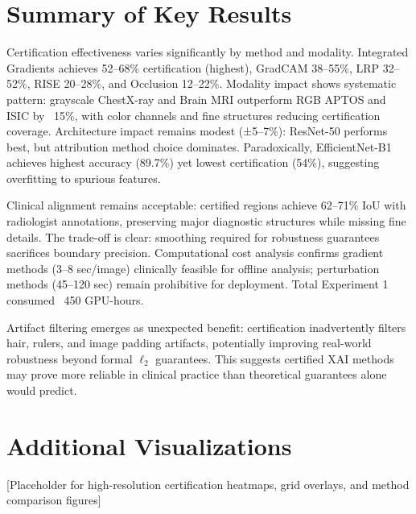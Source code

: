 \documentclass[11pt]{article}
\begin{document}
\newpage

\section{Summary of Key Results}

Certification effectiveness varies significantly by method and modality. Integrated Gradients achieves 52–68\% certification (highest), GradCAM 38–55\%, LRP 32–52\%, RISE 20–28\%, and Occlusion 12–22\%. Modality impact shows systematic pattern: grayscale ChestX-ray and Brain MRI outperform RGB APTOS and ISIC by ~15\%, with color channels and fine structures reducing certification coverage. Architecture impact remains modest (±5–7\%): ResNet-50 performs best, but attribution method choice dominates. Paradoxically, EfficientNet-B1 achieves highest accuracy (89.7\%) yet lowest certification (54\%), suggesting overfitting to spurious features.

Clinical alignment remains acceptable: certified regions achieve 62–71\% IoU with radiologist annotations, preserving major diagnostic structures while missing fine details. The trade-off is clear: smoothing required for robustness guarantees sacrifices boundary precision. Computational cost analysis confirms gradient methods (3–8 sec/image) clinically feasible for offline analysis; perturbation methods (45–120 sec) remain prohibitive for deployment. Total Experiment 1 consumed ~450 GPU-hours.

Artifact filtering emerges as unexpected benefit: certification inadvertently filters hair, rulers, and image padding artifacts, potentially improving real-world robustness beyond formal $\ell_2$ guarantees. This suggests certified XAI methods may prove more reliable in clinical practice than theoretical guarantees alone would predict.

\appendix

\section{Additional Visualizations}

[Placeholder for high-resolution certification heatmaps, grid overlays, and method comparison figures]
\end{document}
